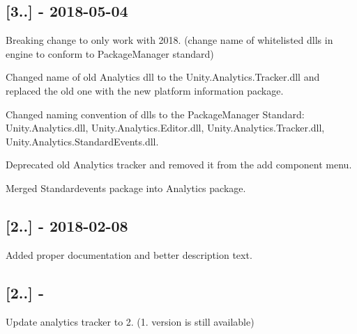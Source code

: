 \subsection*{\mbox{[}3..\mbox{]} -\/ 2018-\/05-\/04}


\begin{DoxyItemize}
\item Breaking change to only work with 2018. (change name of whitelisted dll\textquotesingle{}s in engine to conform to Package\+Manager standard)
\item Changed name of old Analytics dll to the Unity.\+Analytics.\+Tracker.\+dll and replaced the old one with the new platform information package.
\item Changed naming convention of dlls to the Package\+Manager Standard\+: Unity.\+Analytics.\+dll, Unity.\+Analytics.\+Editor.\+dll, Unity.\+Analytics.\+Tracker.\+dll, Unity.\+Analytics.\+Standard\+Events.\+dll.
\item Deprecated old Analytics tracker and removed it from the add component menu.
\item Merged Standardevents package into Analytics package.
\end{DoxyItemize}

\subsection*{\mbox{[}2..\mbox{]} -\/ 2018-\/02-\/08}


\begin{DoxyItemize}
\item Added proper documentation and better description text.
\end{DoxyItemize}

\subsection*{\mbox{[}2..\mbox{]} -\/}


\begin{DoxyItemize}
\item Update analytics tracker to 2. (1. version is still available) 
\end{DoxyItemize}